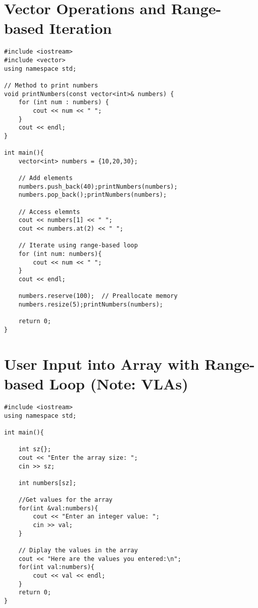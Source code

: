 \documentclass[12pt]{article}
\begin{document}
\section*{Vector Operations and Range-based Iteration}
\begin{verbatim}
#include <iostream>
#include <vector>
using namespace std;

// Method to print numbers
void printNumbers(const vector<int>& numbers) {
    for (int num : numbers) {
        cout << num << " ";
    }
    cout << endl;
}

int main(){
    vector<int> numbers = {10,20,30};

    // Add elements
    numbers.push_back(40);printNumbers(numbers);
    numbers.pop_back();printNumbers(numbers);

    // Access elemnts
    cout << numbers[1] << " ";
    cout << numbers.at(2) << " ";

    // Iterate using range-based loop
    for (int num: numbers){
        cout << num << " ";
    }
    cout << endl;

    numbers.reserve(100);  // Preallocate memory
    numbers.resize(5);printNumbers(numbers);

    return 0;
}
\end{verbatim}


\section*{User Input into Array with Range-based Loop (Note: VLAs)}
\begin{verbatim}
#include <iostream>
using namespace std;

int main(){

    int sz{};
    cout << "Enter the array size: ";
    cin >> sz;

    int numbers[sz];

    //Get values for the array
    for(int &val:numbers){
        cout << "Enter an integer value: ";
        cin >> val;
    }

    // Diplay the values in the array 
    cout << "Here are the values you entered:\n";
    for(int val:numbers){
        cout << val << endl;
    }
    return 0;
}
\end{verbatim}
\end{document}

